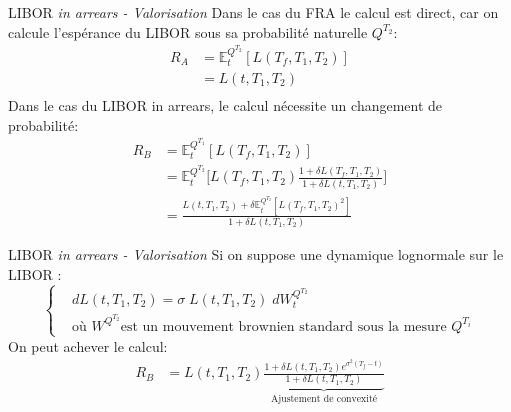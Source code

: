 \documentclass{beamer}
\begin{document}
\begin{frame}{LIBOR \it{in arrears \textnormal{- Valorisation}}}
Dans le cas du FRA le calcul est direct, car on calcule l'espérance du LIBOR sous sa probabilité naturelle $Q^{T_2}$:\\
\[
\begin{split}
R_A&=\mathbb{E}_t^{Q^{T_2}}[L(T_f,T_1,T_2)]\\
&=L(t,T_1,T_2)\\
\end{split}
\]
Dans le cas du LIBOR in arrears, le calcul nécessite un changement de probabilité:
\[
\begin{split}
R_B&=\mathbb{E}_t^{Q^{T_1}}[L(T_f,T_1,T_2)]\\
&=\mathbb{E}_t^{Q^{T_2}}\Big[L(T_f,T_1,T_2)\frac{1+\delta L(T_f,T_1,T_2)}{1+\delta L(t,T_1,T_2)}\Big]\\
&=\frac{L(t,T_1,T_2)+\delta \mathbb{E}_t^{Q^{T_2}}[L(T_f,T_1,T_2)^2]}{1+\delta L(t,T_1,T_2)}
\end{split}
\]
\end{frame}

\begin{frame}{LIBOR \it{in arrears} \textnormal{- Valorisation}}
Si on suppose une dynamique lognormale sur le LIBOR :
\[
\left\{
\begin{split}
&dL(t,T_1,T_2)=\sigma\;L(t,T_1,T_2) \;dW_t^{Q^{T_2}}\\
&\text{où } W^{Q^{T_2}}\text{est un mouvement brownien standard sous la mesure }Q^{T_i}
\end{split}
\right.
\]
On peut achever le calcul:
\[
\begin{split}
R_B&=L(t,T_1,T_2)\underbrace{\frac{1+\delta L(t,T_1,T_2)e^{\sigma^2 (T_f-t)}}{1+\delta L(t,T_1,T_2)}}_{\text{Ajustement de convexité}}
\end{split}
\]
\end{frame}
\end{document}
